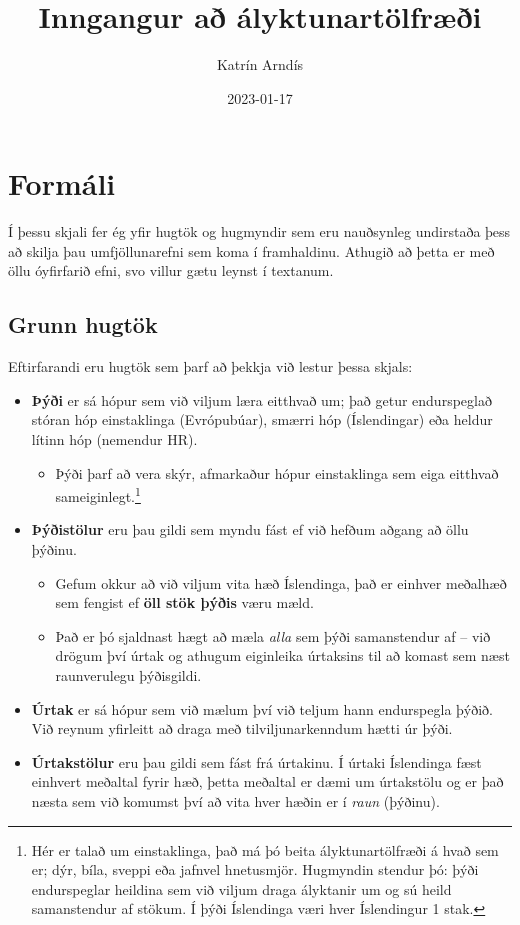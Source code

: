 \documentclass[
]{book}
\title{Inngangur að ályktunartölfræði}
\author{Katrín Arndís}
\date{2023-01-17}
\providecommand{\tightlist}{%
  \setlength{\itemsep}{0pt}\setlength{\parskip}{0pt}}
\begin{document}
\maketitle

{
\setcounter{tocdepth}{1}
\tableofcontents
}
\hypertarget{formuxe1li}{%
\chapter{Formáli}\label{formuxe1li}}

Í þessu skjali fer ég yfir hugtök og hugmyndir sem eru nauðsynleg
undirstaða þess að skilja þau umfjöllunarefni sem koma í framhaldinu.
Athugið að þetta er með öllu óyfirfarið efni, svo villur gætu leynst í
textanum.

\hypertarget{grunn-hugtuxf6k}{%
\section{Grunn hugtök}\label{grunn-hugtuxf6k}}

Eftirfarandi eru hugtök sem þarf að þekkja við lestur þessa skjals:

\begin{itemize}
\tightlist
\item
  \textbf{Þýði} er sá hópur sem við viljum læra eitthvað um; það getur
  endurspeglað stóran hóp einstaklinga (Evrópubúar), smærri hóp
  (Íslendingar) eða heldur lítinn hóp (nemendur HR).

  \begin{itemize}
  \tightlist
  \item
    Þýði þarf að vera skýr, afmarkaður hópur einstaklinga sem eiga
    eitthvað sameiginlegt.\footnote{Hér er talað um einstaklinga, það má þó beita
      ályktunartölfræði á hvað sem er; dýr, bíla, sveppi eða jafnvel
      hnetusmjör. Hugmyndin stendur þó: þýði endurspeglar heildina sem við
      viljum draga ályktanir um og sú heild samanstendur af stökum. Í þýði
      Íslendinga væri hver Íslendingur 1 stak.}
  \end{itemize}
\item
  \textbf{Þýðistölur} eru þau gildi sem myndu fást ef við hefðum aðgang að
  öllu þýðinu.

  \begin{itemize}
  \item
    Gefum okkur að við viljum vita hæð Íslendinga, það er einhver
    meðalhæð sem fengist ef \textbf{öll stök þýðis} væru mæld.
  \item
    Það er þó sjaldnast hægt að mæla \emph{alla} sem þýði samanstendur af
    -- við drögum því úrtak og athugum eiginleika úrtaksins til að
    komast sem næst raunverulegu þýðisgildi.
  \end{itemize}
\item
  \textbf{Úrtak} er sá hópur sem við mælum því við teljum hann endurspegla
  þýðið. Við reynum yfirleitt að draga með tilviljunarkenndum hætti úr
  þýði.
\item
  \textbf{Úrtakstölur} eru þau gildi sem fást frá úrtakinu. Í úrtaki
  Íslendinga fæst einhvert meðaltal fyrir hæð, þetta meðaltal er dæmi
  um úrtakstölu og er það næsta sem við komumst því að vita hver hæðin
  er í \emph{raun} (þýðinu).
\end{itemize}
\end{document}
